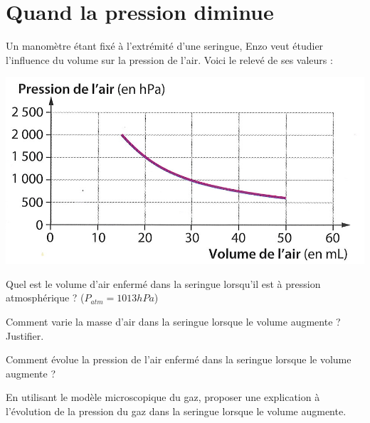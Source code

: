 \section{Quand la pression diminue}

Un manomètre étant fixé à l'extrémité d'une seringue, Enzo veut étudier l'influence du volume sur la pression de l'air. Voici le relevé de ses valeurs :

\begin{center}
	\includegraphics[scale=1.5]{pression}
\end{center}

\begin{questions}
	\question Quel est le volume d'air enfermé dans la seringue lorsqu'il est à pression atmosphérique ? ($P_{atm}=1013 hPa$)
	
	\fillwithdottedlines{2cm}
	
	\question Comment varie la masse d'air dans la seringue lorsque le volume augmente ? Justifier.
	
	
	\fillwithdottedlines{2cm}
	
	\question Comment évolue la pression de l'air enfermé dans la seringue lorsque le volume augmente ?
	
	\fillwithdottedlines{2cm}
	
	
	
	\question En utilisant le modèle microscopique du gaz, proposer une explication à l'évolution de la pression du gaz dans la seringue lorsque le volume augmente.
	
	\fillwithdottedlines{3cm}
\end{questions}